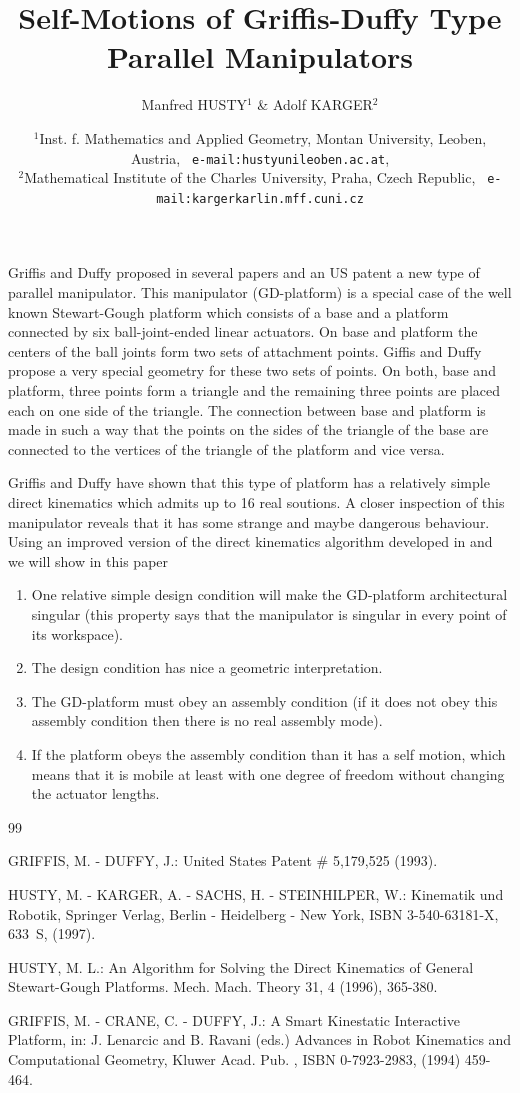 \documentclass[12pt]{article}
\title{Self-Motions of Griffis-Duffy Type Parallel Manipulators}
\author{ Manfred HUSTY$^1$ \& Adolf KARGER$^2$}
\date{\small $^1$Inst. f. Mathematics and Applied Geometry, Montan
  University, Leoben, Austria, {\tt
    e-mail:husty\symbol{64}unileoben.ac.at},\\ $^2$Mathematical
  Institute of the Charles University, Praha, Czech Republic, {\tt
    e-mail:karger\symbol{64}karlin.mff.cuni.cz} }
\begin{document}
\maketitle

Griffis and Duffy proposed in several papers and an US patent
\cite{du} a new type of parallel manipulator. This manipulator
(GD-platform) is a special case of the well known Stewart-Gough
platform which consists of a base and a platform connected by six
ball-joint-ended linear actuators. On base and platform the centers of
the ball joints form two sets of attachment points. Giffis and Duffy
propose a very special geometry for these two sets of points. On both,
base and platform, three points form a triangle and the remaining
three points are placed each on one side of the triangle. The
connection between base and platform is made in such a way that the
points on the sides of the triangle of the base are connected to the
vertices of the triangle of the platform and vice versa.

Griffis and  Duffy have shown that this type of platform has a
relatively simple direct kinematics which admits up to 16 real
soutions.  A closer inspection of this manipulator reveals that it has
some strange and maybe dangerous behaviour. Using an improved version
of the direct kinematics algorithm developed in \cite{hu1} and
\cite{ka1} we will show in this paper

\begin{enumerate}
\item One relative simple design condition will make the GD-platform
  architectural singular (this property says that the manipulator is
  singular in every point of its workspace).
\item The design condition has nice  a geometric interpretation.
\item The GD-platform must obey an assembly condition (if it does
 not obey this assembly condition then there is no real assembly mode).
\item If the platform obeys the assembly condition than it has a self
  motion, which means that it is mobile at least with one degree of
  freedom without changing the actuator lengths.
\end{enumerate}

\begin{thebibliography}{99}


GRIFFIS, M. - DUFFY, J.: United States Patent \# 5,179,525
  (1993).

HUSTY, M. - KARGER, A. - SACHS, H. - STEINHILPER, W.:
  Kinematik und Robotik, Springer Verlag, Berlin - Heidelberg - New
  York, ISBN 3-540-63181-X, 633~S, (1997).

 HUSTY, M. L.: An Algorithm for Solving the Direct
  Kinematics of General Stewart-Gough Platforms. Mech. Mach. Theory
  31, 4 (1996), 365-380.


GRIFFIS, M. - CRANE, C. - DUFFY, J.: A Smart Kinestatic
Interactive Platform, in: J. Lenarcic and B. Ravani (eds.) Advances in
Robot Kinematics and Computational Geometry, Kluwer Acad. Pub. , ISBN
0-7923-2983, (1994) 459-464.
\end{thebibliography}
\end{document}
